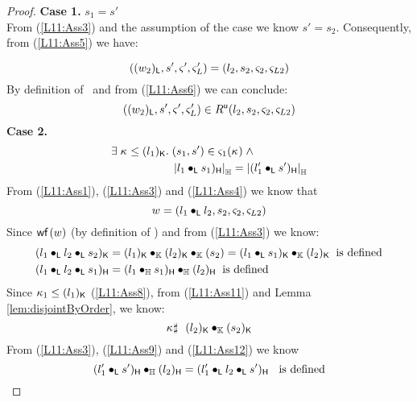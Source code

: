 \begin{lemma}[]
\begin{proof}
\noindent\textbf{Case 1.} $s_1 = s'$\\
From (\ref{L11:Ass3}) and the assumption of the case we know $s' = s_2$. Consequently, from (\ref{L11:Ass5}) we have:

\begin{equation}
	((w_2)_{\textsf{L}}, s', \varsigma_{}', \varsigma_{L}') = (l_2, s_2, \varsigma_{2}, \varsigma_{L2}) \label{L11:Ass6}
\end{equation}
%
By definition of \updateR\ and from (\ref{L11:Ass6}) we can conclude:
%
\begin{equation}
	((w_2)_{\textsf{L}}, s', \varsigma_{}', \varsigma_{L}') \in R^{\textsf{u}}(l_2, s_2, \varsigma_{2}, \varsigma_{L2}) \label{L11:Ass7}
\end{equation}
%
\textbf{Case 2.} 
%
\begin{align}
	\exists\; \kappa_{} \leq (l_1)_{\textsf{K}}.\; & (s_1, s') \in \varsigma_{1}(\kappa_{}) \label{L11:Ass8} \;\land\\
	&\left\lvert l_1 \bullet_{\textsf{L}} s_1)_{\textsf{H}}\right\rvert_{\mathbb{H}} = \left\lvert (l'_1 \bullet_{\textsf{L}} s')_{\textsf{H}}\right\rvert_{\mathbb{H}} \label{L11:Ass9}
\end{align}
%
From (\ref{L11:Ass1}), (\ref{L11:Ass3}) and (\ref{L11:Ass4}) we know that 
%
\begin{equation}
	w = (l_1 \bullet_{\textsf{L}} l_2, s_2, \varsigma_{2}, \varsigma_{L2}) \label{L11:Ass10}
\end{equation}
%
Since $\textsf{wf}\left( w \right)$ (by definition of \Worlds) and from (\ref{L11:Ass3}) we know:
\begin{align}
	&\capPart{(l_1 \composeL l_2 \composeL s_2)} = \capPart{(l_1)} \composeCap \capPart{(l_2)} \composeCap {(s_2)} = \capPart{(l_1 \composeL s_1)} \composeCap \capPart{(l_2)}\hspace*{0.2cm} \text{is defined} \label{L11:Ass11}\\
%	
	&\heapPart{(l_1 \composeL l_2 \composeL s_1)} = \heapPart{(l_1 \composeH s_1)} \composeH \heapPart{(l_2)}  \hspace*{0.2cm} \text{is defined} \label{L11:Ass12}
\end{align}
%
Since $\kappa_{1} \leq (l_1)_{\textsf{K}}$ (\ref{L11:Ass8}), from (\ref{L11:Ass11}) and Lemma \ref{lem:disjointByOrder}, we know:
%
\begin{equation}
	\kappa_{} \sharp\ \ (l_2)_{\textsf{K}} \bullet_{\mathbb{K}} (s_2)_{\textsf{K}} \label{L11:Ass13}
\end{equation}
%
From (\ref{L11:Ass3}), (\ref{L11:Ass9}) and (\ref{L11:Ass12}) we know
%
\begin{equation}
	\heapPart{(l'_1 \composeL s')} \composeH \heapPart{(l_2)} = \heapPart{(l'_1 \composeL l_2 \composeL s')}\hspace*{0.2cm}\text{ is defined} \label{L11:Ass14}

\end{equation}
\end{proof}
\end{lemma}
